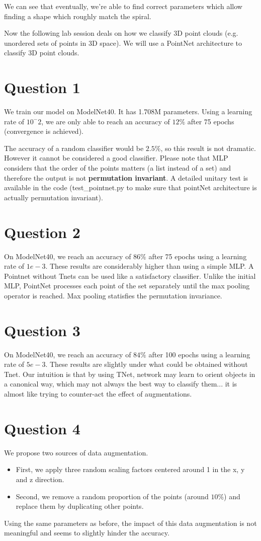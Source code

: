 \documentclass[a4paper]{article}
\begin{document}
We can see that eventually, we're able to find correct parameters which allow finding a shape which roughly match the spiral.   

Now the following lab session deals on how we classify 3D point clouds (e.g. unordered sets of points in 3D space). We will use a PointNet architecture to classify 3D point clouds.

\section*{Question 1}

We train our model on ModelNet40. It has 1.708M parameters. Using a learning rate of $10^{-}2$, we
are only able to reach an accuracy of $12\%$ after 75 epochs (convergence is achieved).

The accuracy of a random classifier would be $2.5\%$, so this result is not dramatic. 
However it cannot be considered a good classifier.
Please note that MLP considers that the order of the points matters (a list instead of a set) and therefore the output is not \textbf{permutation invariant}.
A detailed unitary test is available in the code (test\_pointnet.py to make sure that pointNet architecture is actually permutation invariant).


\section*{Question 2}
On ModelNet40, we reach an accuracy of $86\%$ after 75 epochs using a learning rate of $1e-3$.
These results are considerably higher than using a simple MLP. A Pointnet without Tnets can be used
like a satisfactory classifier.
Unlike the initial MLP, PointNet processes each point of the set separately until the max pooling operator is reached. Max pooling statisfies the permutation invariance.


\section*{Question 3}
On ModelNet40, we reach an accuracy of $84\%$ after 100 epochs using a learning rate of $5e-3$.
These results are slightly under what could be obtained without Tnet.
Our intuition is that by using TNet, network may learn to orient objects in a canonical way, which may not always the best way to classify them... it is almost like trying to counter-act the effect of augmentations.

\section*{Question 4}
We propose two sources of data augmentation. 
\begin{itemize}
    \item First, we apply three random scaling factors centered around 1 in the x, y and z direction. 
    \item Second, we remove a random proportion of the points (around $10\%$) and replace them by duplicating other points.
\end{itemize}
Using the same parameters as before, the impact of this data augmentation is not meaningful and seems to slightly hinder the accuracy.
\end{document}
